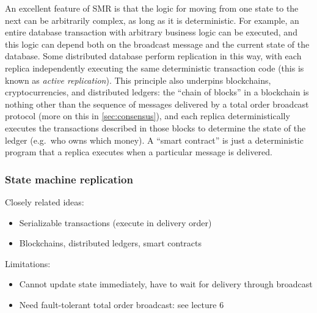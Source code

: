 An excellent feature of SMR is that the logic for moving from one state to the next can be arbitrarily complex, as long as it is deterministic.
For example, an entire database transaction with arbitrary business logic can be executed, and this logic can depend both on the broadcast message and the current state of the database.
Some distributed database perform replication in this way, with each replica independently executing the same deterministic transaction code (this is known as \emph{active replication}).
This principle also underpins blockchains, cryptocurrencies, and distributed ledgers: the ``chain of blocks'' in a blockchain is nothing other than the sequence of messages delivered by a total order broadcast protocol (more on this in \autoref{sec:consensus}), and each replica deterministically executes the transactions described in those blocks to determine the state of the ledger (e.g.\ who owns which money).
A ``smart contract'' is just a deterministic program that a replica executes when a particular message is delivered.

\begin{frame}
    \label{s:smr2}
    \frametitle{State machine replication}
    \pause\vspace*{0.5em}
    Closely related ideas:
    \begin{itemize}
        \item Serializable transactions (execute in delivery order)\pause
        \item Blockchains, distributed ledgers, smart contracts\pause
    \end{itemize}
    Limitations:
    \begin{itemize}
        \item Cannot update state immediately, have to wait for delivery through broadcast\pause
        \item Need fault-tolerant total order broadcast: see lecture 6
    \end{itemize}
\end{frame}
\label{l:smr2}

